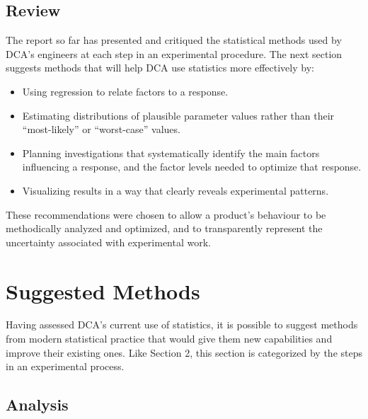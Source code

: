 \documentclass[11pt,a4paper,article]{memoir} %
\begin{document}
\section{Review}
The report so far has presented and critiqued the statistical methods used by DCA's engineers at each step in an experimental procedure. The next section suggests methods that will help DCA use statistics more effectively by:
\begin{itemize}
\item Using regression to relate factors to a response.
\item Estimating distributions of plausible parameter values rather than their ``most-likely'' or ``worst-case'' values.
\item Planning investigations that systematically identify the main factors influencing a response, and the factor levels needed to optimize that response.
\item Visualizing results in a way that clearly reveals experimental patterns.
\end{itemize}
These recommendations were chosen to allow a product's behaviour to be methodically analyzed and optimized, and to  transparently represent the uncertainty associated with experimental work.

\newpage
\chapter{Suggested Methods}\label{suggested_methods}
\label{chap:modernstats}

Having assessed DCA's current use of statistics, it is possible to suggest methods from modern statistical practice that would give them new capabilities and improve their existing ones. Like Section 2, this section is categorized by the steps in an experimental process.

\section{Analysis}
\end{document}
